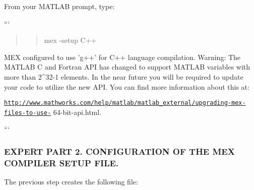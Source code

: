 \begin{DoxyPre}From your MATLAB prompt, type:\end{DoxyPre}



\begin{DoxyPre}```
\begin{quotation}
\begin{quotation}
mex -setup C++

\end{quotation}


\end{quotation}
MEX configured to use 'g++' for C++ language compilation.
Warning: The MATLAB C and Fortran API has changed to support MATLAB
     variables with more than 2^32-1 elements. In the near future
     you will be required to update your code to utilize the
     new API. You can find more information about this at:\end{DoxyPre}



\begin{DoxyPre}\href{http://www.mathworks.com/help/matlab/matlab_external/upgrading-mex-files-to-use-}{\tt http://www.mathworks.com/help/matlab/matlab\_external/upgrading-mex-files-to-use-}
64-bit-api.html.
\begin{quotation}
\begin{quotation}


\end{quotation}


\end{quotation}
```\end{DoxyPre}



\begin{DoxyPre}\subsubsection*{EXPERT PART 2. CONFIGURATION OF THE MEX COMPILER SETUP FILE.}\end{DoxyPre}



\begin{DoxyPre}\end{DoxyPre}



\begin{DoxyPre}The previous step creates the following file:\end{DoxyPre}




